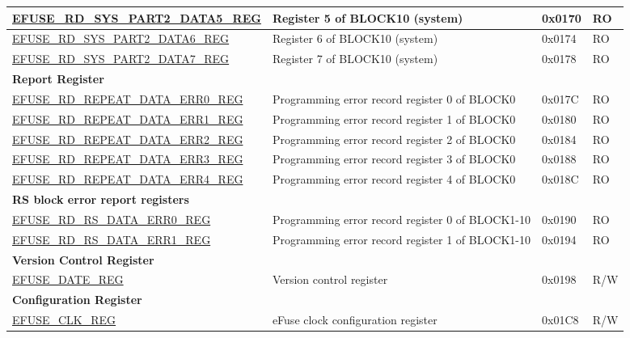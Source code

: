 \begin{longtable}{ | p{6.8cm} | p{7cm} | p{1.3cm} | p{1.2cm} | }
    \hyperref[regdesc:EFUSERDSYSPART2DATANREG]{EFUSE\_RD\_SYS\_PART2\_DATA5\_REG} & Register 5 of BLOCK10 (system) & 0x0170 & RO \\ \hline
    \hyperref[regdesc:EFUSERDSYSPART2DATANREG]{EFUSE\_RD\_SYS\_PART2\_DATA6\_REG} & Register 6 of BLOCK10 (system) & 0x0174 & RO \\ \hline
    \hyperref[regdesc:EFUSERDSYSPART2DATANREG]{EFUSE\_RD\_SYS\_PART2\_DATA7\_REG} & Register 7 of BLOCK10 (system) & 0x0178 & RO \\ \hline
    \multicolumn{4}{|l|}{\textbf{Report Register}} \\ \hline
    \hyperref[regdesc:EFUSERDREPEATDATAERR0REG]{EFUSE\_RD\_REPEAT\_DATA\_ERR0\_REG} & Programming error record register 0 of BLOCK0 & 0x017C & RO \\ \hline
    \hyperref[regdesc:EFUSERDREPEATDATAERR1REG]{EFUSE\_RD\_REPEAT\_DATA\_ERR1\_REG} & Programming error record register 1 of BLOCK0 & 0x0180 & RO \\ \hline
    \hyperref[regdesc:EFUSERDREPEATDATAERR2REG]{EFUSE\_RD\_REPEAT\_DATA\_ERR2\_REG} & Programming error record register 2 of BLOCK0 & 0x0184 & RO \\ \hline
    \hyperref[regdesc:EFUSERDREPEATDATAERR3REG]{EFUSE\_RD\_REPEAT\_DATA\_ERR3\_REG} & Programming error record register 3 of BLOCK0 & 0x0188 & RO \\ \hline
    \hyperref[regdesc:EFUSERDREPEATDATAERR4REG]{EFUSE\_RD\_REPEAT\_DATA\_ERR4\_REG} & Programming error record register 4 of BLOCK0 & 0x018C & RO \\ \hline
    \multicolumn{4}{|l|}{\textbf{RS block error report registers}} \\ \hline
    \hyperref[regdesc:EFUSERDRSDATAERR0REG]{EFUSE\_RD\_RS\_DATA\_ERR0\_REG} & Programming error record register 0 of BLOCK1-10 & 0x0190 & RO \\ \hline
    \hyperref[regdesc:EFUSERDRSDATAERR1REG]{EFUSE\_RD\_RS\_DATA\_ERR1\_REG} & Programming error record register 1 of BLOCK1-10 & 0x0194 & RO \\ \hline
    \multicolumn{4}{|l|}{\textbf{Version Control Register}} \\ \hline
    \hyperref[regdesc:EFUSEDATEREG]{EFUSE\_DATE\_REG} & Version control register & 0x0198 & R/W \\ \hline
    \multicolumn{4}{|l|}{\textbf{Configuration Register}} \\ \hline
    \hyperref[regdesc:EFUSECLKREG]{EFUSE\_CLK\_REG} & eFuse clock configuration register & 0x01C8 & R/W \\ \hline

\end{longtable}

